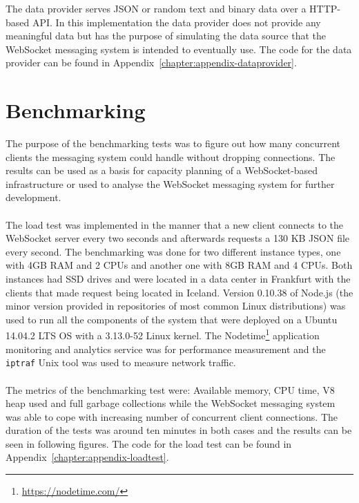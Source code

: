 The data provider serves JSON or random text and binary data over a HTTP-based API. In this implementation the data provider does not provide any meaningful data but has the purpose of simulating the data source that the WebSocket messaging system is intended to eventually use. The code for the data provider can be found in Appendix~\ref{chapter:appendix-dataprovider}.

\section{Benchmarking}

The purpose of the benchmarking tests was to figure out how many concurrent clients the messaging system could handle without dropping connections. The results can be used as a basis for capacity planning of a WebSocket-based infrastructure or used to analyse the WebSocket messaging system for further development.
\\ \\
The load test was implemented in the manner that a new client connects to the WebSocket server every two seconds and afterwards requests a 130 KB JSON file every second. The benchmarking was done for two different instance types, one with 4GB RAM  and 2 CPUs and another one with 8GB RAM and 4 CPUs. Both instances had SSD drives and were located in a data center in Frankfurt with the clients that made request being located in Iceland. Version 0.10.38 of Node.js (the minor version provided in repositories of most common Linux distributions) was used to run all the components of the system that were deployed on a Ubuntu 14.04.2 LTS OS with a 3.13.0-52 Linux kernel. The Nodetime\footnote{\url{https://nodetime.com/}} application monitoring and analytics service was for performance measurement and the \texttt{iptraf} Unix tool was used to measure network traffic.
\\ \\
The metrics of the benchmarking test were: Available memory, CPU time, V8 heap used and full garbage collections while the WebSocket messaging system was able to cope with increasing number of concurrent client connections. The duration of the tests was around ten minutes in both cases and the results can be seen in following figures. The code for the load test can be found in Appendix~\ref{chapter:appendix-loadtest}.
\\
